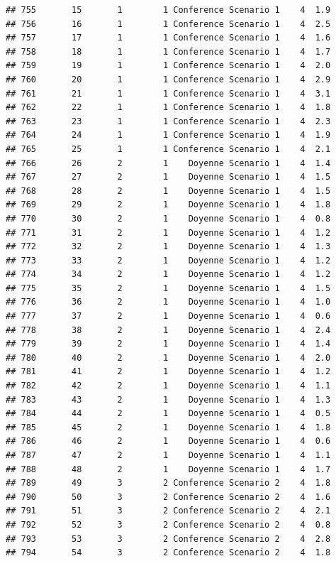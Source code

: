 \documentclass[
]{article}
\begin{document}
\begin{verbatim}
## 755       15       1        1 Conference Scenario 1    4  1.9
## 756       16       1        1 Conference Scenario 1    4  2.5
## 757       17       1        1 Conference Scenario 1    4  1.6
## 758       18       1        1 Conference Scenario 1    4  1.7
## 759       19       1        1 Conference Scenario 1    4  2.0
## 760       20       1        1 Conference Scenario 1    4  2.9
## 761       21       1        1 Conference Scenario 1    4  3.1
## 762       22       1        1 Conference Scenario 1    4  1.8
## 763       23       1        1 Conference Scenario 1    4  2.3
## 764       24       1        1 Conference Scenario 1    4  1.9
## 765       25       1        1 Conference Scenario 1    4  2.1
## 766       26       2        1    Doyenne Scenario 1    4  1.4
## 767       27       2        1    Doyenne Scenario 1    4  1.5
## 768       28       2        1    Doyenne Scenario 1    4  1.5
## 769       29       2        1    Doyenne Scenario 1    4  1.8
## 770       30       2        1    Doyenne Scenario 1    4  0.8
## 771       31       2        1    Doyenne Scenario 1    4  1.2
## 772       32       2        1    Doyenne Scenario 1    4  1.3
## 773       33       2        1    Doyenne Scenario 1    4  1.2
## 774       34       2        1    Doyenne Scenario 1    4  1.2
## 775       35       2        1    Doyenne Scenario 1    4  1.5
## 776       36       2        1    Doyenne Scenario 1    4  1.0
## 777       37       2        1    Doyenne Scenario 1    4  0.6
## 778       38       2        1    Doyenne Scenario 1    4  2.4
## 779       39       2        1    Doyenne Scenario 1    4  1.4
## 780       40       2        1    Doyenne Scenario 1    4  2.0
## 781       41       2        1    Doyenne Scenario 1    4  1.2
## 782       42       2        1    Doyenne Scenario 1    4  1.1
## 783       43       2        1    Doyenne Scenario 1    4  1.3
## 784       44       2        1    Doyenne Scenario 1    4  0.5
## 785       45       2        1    Doyenne Scenario 1    4  1.8
## 786       46       2        1    Doyenne Scenario 1    4  0.6
## 787       47       2        1    Doyenne Scenario 1    4  1.1
## 788       48       2        1    Doyenne Scenario 1    4  1.7
## 789       49       3        2 Conference Scenario 2    4  1.8
## 790       50       3        2 Conference Scenario 2    4  1.6
## 791       51       3        2 Conference Scenario 2    4  2.1
## 792       52       3        2 Conference Scenario 2    4  0.8
## 793       53       3        2 Conference Scenario 2    4  2.8
## 794       54       3        2 Conference Scenario 2    4  1.8

\end{verbatim}
\end{document}
